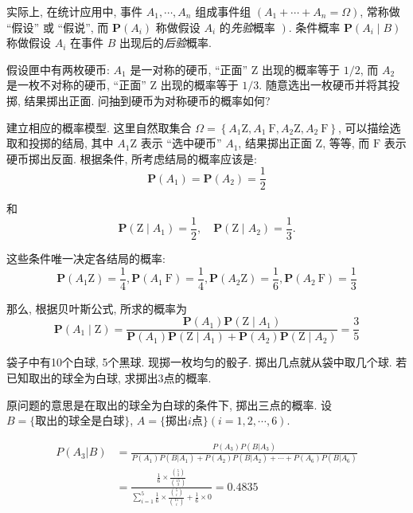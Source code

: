     实际上, 在统计应用中, 事件 $A_1, \cdots, A_n$ 组成事件组 $\left(A_1+\cdots+A_n=\Omega\right)$, 常称做 “假设” 或 “假说”, 而 $\mathbf{P}\left(A_i\right)$ 称做假设 $A_i$ 的\emph{先验}概率 $\left.\right)$. 条件概率 $\mathbf{P}\left(A_i \mid B\right)$ 称做假设 $A_i$ 在事件 $B$ 出现后的\emph{后验}概率. 


\begin{exercise}
    假设匣中有两枚硬币: $A_1$ 是一对称的硬币, “正面” $\mathrm{Z}$ 出现的概率等于 $1 / 2$, 而 $A_2$ 是一枚不对称的硬币, “正面” $\mathrm{Z}$ 出现的概率等于 $1 / 3$. 随意选出一枚硬币并将其投掷, 结果掷出正面. 问抽到硬币为对称硬币的概率如何?
\end{exercise}

\begin{solution}
    建立相应的概率模型. 这里自然取集合 $\Omega=\left\{A_1 \mathrm{Z}, A_1 \mathrm{~F}, A_2 \mathrm{Z}, A_2 \mathrm{~F}\right\}$, 可以描绘选取和投掷的结局, 其中 $A_1 \mathrm{Z}$ 表示 “选中硬币” $A_1$, 结果掷出正面 $\mathrm{Z}$, 等等, 而 $\mathrm{F}$ 表示硬币掷出反面. 根据条件, 所考虑结局的概率应该是:
$$
\mathbf{P}\left(A_1\right)=\mathbf{P}\left(A_2\right)=\frac{1}{2}
$$

和
$$
\mathbf{P}\left(\mathrm{Z} \mid A_1\right)=\frac{1}{2}, \quad \mathbf{P}\left(\mathrm{Z} \mid A_2\right)=\frac{1}{3} .
$$

这些条件唯一决定各结局的概率:
$$
\mathbf{P}\left(A_1 \mathrm{Z}\right)=\frac{1}{4}, \mathbf{P}\left(A_1 \mathrm{~F}\right)=\frac{1}{4}, \mathbf{P}\left(A_2 \mathrm{Z}\right)=\frac{1}{6}, \mathbf{P}\left(A_2 \mathrm{~F}\right)=\frac{1}{3}
$$

那么, 根据贝叶斯公式, 所求的概率为
$$
\mathbf{P}\left(A_1 \mid \mathrm{Z}\right)=\frac{\mathbf{P}\left(A_1\right) \mathbf{P}\left(\mathrm{Z} \mid A_1\right)}{\mathbf{P}\left(A_1\right) \mathbf{P}\left(\mathrm{Z} \mid A_1\right)+\mathbf{P}\left(A_2\right) \mathbf{P}\left(\mathrm{Z} \mid A_2\right)}=\frac{3}{5}
$$
\end{solution}

\begin{exercise}
    袋子中有10个白球, 5个黑球. 现掷一枚均匀的骰子. 掷出几点就从袋中取几个球. 若已知取出的球全为白球, 求掷出3点的概率. 
\end{exercise}

\begin{solution}
    原问题的意思是在取出的球全为白球的条件下, 掷出三点的概率. 设$B=\{\text{取出的球全是白球}\}$, $A=\{\text{掷出}i\text{点}\}(i=1,2,\cdots, 6)$.

    \begin{align*}
        P(A_3 | B) &= \frac{P(A_3)P(B|A_3)}{P(A_1)P(B|A_1)+P(A_2)P(B|A_2)+\cdots+P(A_6)P(B|A_6)} \\
        &= \frac{\frac16 \times \frac{\binom 53}{\binom {15}3}}{\sum_{i=1}^5 \frac16\times \frac{\binom 5i}{\binom{15}i}+\frac16\times 0}=0.4835
    \end{align*}
\end{solution}


